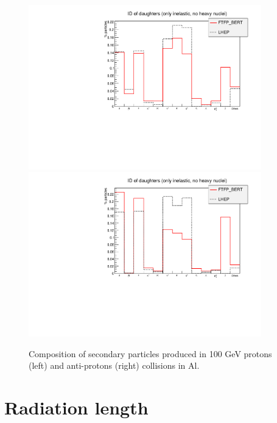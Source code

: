 \begin{center}
\begin{figure}[h!]
\centering \includegraphics[width=0.9\textwidth]{Detector/figs/validation/perc_pbarcomp.pdf}
\includegraphics[width=0.9\textwidth]{Detector/figs/validation/perc_pcomp.pdf}
\caption{Composition of secondary particles produced in 100 GeV protons (left) and anti-protons (right) collisions in Al.}
\end{figure}
\label{fig:IDs_valdation}
\end{center}

\clearpage
\section{Radiation length}

